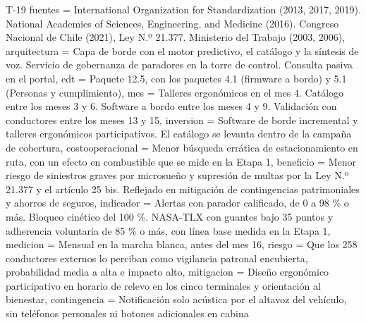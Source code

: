 \begin{formulario}{T-19}
{  fuentes = {International Organization for Standardization (2013, 2017, 2019). National Academies of Sciences, Engineering, and Medicine (2016). Congreso Nacional de Chile (2021), Ley N.º 21.377. Ministerio del Trabajo (2003, 2006)},
  arquitectura = {Capa de borde con el motor predictivo, el catálogo y la síntesis de voz. Servicio de gobernanza de paradores en la torre de control. Consulta pasiva en el portal},
  edt = {Paquete 12.5, con los paquetes 4.1 (firmware a bordo) y 5.1 (Personas y cumplimiento)},
  mes = {Talleres ergonómicos en el mes 4. Catálogo entre los meses 3 y 6. Software a bordo entre los meses 4 y 9. Validación con conductores entre los meses 13 y 15},
  inversion = {Software de borde incremental y talleres ergonómicos participativos. El catálogo se levanta dentro de la campaña de cobertura},
  costooperacional = {Menor búsqueda errática de estacionamiento en ruta, con un efecto en combustible que se mide en la Etapa 1},
  beneficio = {Menor riesgo de siniestros graves por microsueño y supresión de multas por la Ley N.º 21.377 y el artículo 25 bis. Reflejado en mitigación de contingencias patrimoniales y ahorros de seguros},
  indicador = {Alertas con parador calificado, de 0 a 98 \% o más. Bloqueo cinético del 100 \%. NASA-TLX con guantes bajo 35 puntos y adherencia voluntaria de 85 \% o más, con línea base medida en la Etapa 1},
  medicion = {Mensual en la marcha blanca, antes del mes 16},
  riesgo = {Que los 258 conductores externos lo perciban como vigilancia patronal encubierta, probabilidad media a alta e impacto alto},
  mitigacion = {Diseño ergonómico participativo en horario de relevo en los cinco terminales y orientación al bienestar},
  contingencia = {Notificación solo acústica por el altavoz del vehículo, sin teléfonos personales ni botones adicionales en cabina}
}
\end{formulario}
